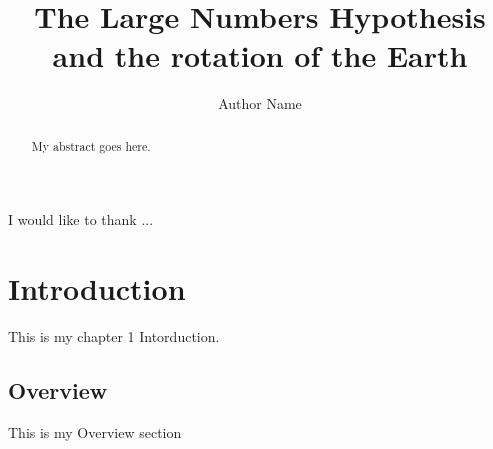 \documentclass[master, copyright]{resources/class/ms_thesis}
\title{The Large Numbers Hypothesis and the rotation of the Earth}
\author{Author Name}
\begin{document}
\frontmatter  
%




\begin{abstract}      
My abstract goes here.
\end{abstract}





\begin{acknowledgements}
I would like to thank ...
\end{acknowledgements}


\mainmatter
%
%
%
%
%
		\tableofcontents           %

\chapter{Introduction}
This is my chapter 1 Intorduction.
\section{Overview}
This is my Overview section
\newpage
\end{document}
